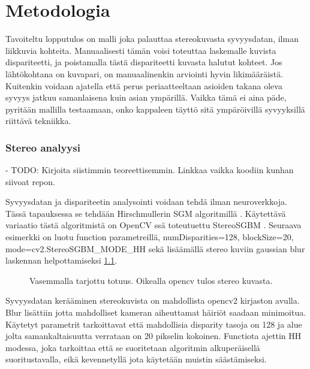 \chapter{Metodologia}
\label{ch:metodologia}

Tavoiteltu lopputulos on malli joka palauttaa stereokuvasta syvyysdatan, ilman liikkuvia kohteita.
Manuaalisesti tämän voisi toteuttaa laskemalle kuvista dispariteetti, ja poistamalla tästä dispariteetti kuvasta halutut kohteet.
Jos lähtökohtana on kuvapari, on manuaalinenkin arviointi hyvin likimääräistä. Kuitenkin voidaan ajatella että perus periaatteeltaan asioiden takana oleva syvyys jatkuu samanlaisena kuin asian ympärillä.
Vaikka tämä ei aina päde, pyritään mallilla testaamaan, onko kappaleen täyttö sitä ympäröivillä syvyyksillä riittävä tekniikka.

\subsection{Stereo analyysi}

- TODO: Kirjoita siistimmin teoreettisemmin. Linkkaa vaikka koodiin kunhan siivoat repon.

Syvyysdatan ja dispariteetin analysointi voidaan tehdä ilman neuroverkkoja.
Tässä tapauksessa se tehdään Hirschmullerin SGM algoritmillä \cite{hirschmuller2005babel}.
Käytettävä variaatio tästä algoritmistä on OpenCV ssä toteutuettu StereoSGBM \cite{opencvsgbm}.
Seuraava esimerkki on luotu function parametreillä, numDisparities=128, blockSize=20, mode=cv2.StereoSGBM\_MODE\_HH
sekä lisäämällä stereo kuviin gaussian blur laskennan helpottamiseksi \ref{fig:disparity1}.

\begin{figure}[h]
\centering
{}
\caption[Tämä on lyhyt kuvateksti.]{Vasemmalla tarjottu totuus. Oikealla opencv tulos stereo kuvasta.}
\label{fig:disparity1}
\end{figure}
    
Syvyysdatan kerääminen stereokuvista on mahdollista opencv2 kirjaston avulla.
Blur lisättiin jotta mahdolliset kameran aiheuttamat häiriöt saadaan minimoitua.
Käytetyt parametrit tarkoittavat että mahdollisia disparity tasoja on 128 ja alue jolta samankaltaisuutta verrataan on 20 pikselin kokoinen.
Functiota ajettin HH modessa, joka tarkoittaa että se suoritetaan algoritmin alkuperäisellä suoritustavalla, eikä kevennetyllä jota käytetään muistin säästämiseksi.

